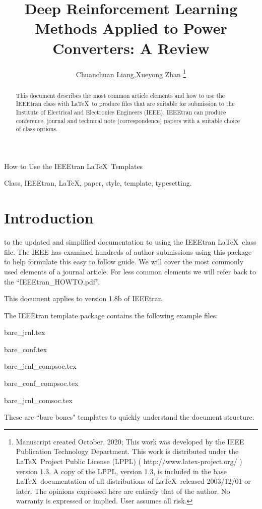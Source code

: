 \documentclass[lettersize,journal]{IEEEtran}
\begin{document}
\title{Deep Reinforcement Learning Methods Applied to Power Converters: A Review}
\author{Chuanchuan Liang,Xueyong Zhan
\thanks{Manuscript created October, 2020; This work was developed by the IEEE Publication Technology Department. This work is distributed under the \LaTeX \ Project Public License (LPPL) ( http://www.latex-project.org/ ) version 1.3. A copy of the LPPL, version 1.3, is included in the base \LaTeX \ documentation of all distributions of \LaTeX \ released 2003/12/01 or later. The opinions expressed here are entirely that of the author. No warranty is expressed or implied. User assumes all risk.}}

%
{How to Use the IEEEtran \LaTeX \ Templates}

\maketitle

\begin{abstract}
This document describes the most common article elements and how to use the IEEEtran class with \LaTeX \ to produce files that are suitable for submission to the Institute of Electrical and Electronics Engineers (IEEE).  IEEEtran can produce conference, journal and technical note (correspondence) papers with a suitable choice of class options.
\end{abstract}

\begin{IEEEkeywords}
Class, IEEEtran, \LaTeX, paper, style, template, typesetting.
\end{IEEEkeywords}


\section{Introduction}
 to the updated and simplified documentation to using the IEEEtran \LaTeX \ class file. The IEEE has examined hundreds of author submissions using this package to help formulate this easy to follow guide. We will cover the most commonly used elements of a journal article. For less common elements we will refer back to the ``IEEEtran\_HOWTO.pdf''.

This document applies to version 1.8b of IEEEtran. 

The IEEEtran template package contains the following example files: 
\begin{list}{}{}
\item{bare\_jrnl.tex}
\item{bare\_conf.tex}
\item{bare\_jrnl\_compsoc.tex}
\item{bare\_conf\_compsoc.tex}
\item{bare\_jrnl\_comsoc.tex}
\end{list}
These are ``bare bones" templates to quickly understand the document structure.  
\end{document}
